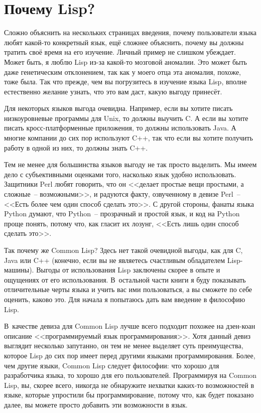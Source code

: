 \section{Почему Lisp?}

Сложно объяснить на нескольких страницах введения, почему пользователи языка любят
какой-то конкретный язык, ещё сложнее объяснить, почему вы должны тратить своё время на
его изучение. Личный пример не слишком убеждает. Может быть, я люблю Lisp из-за какой-то
мозговой аномалии. Это может быть даже генетическим отклонением, так
как у моего отца эта аномалия, похоже, тоже была. Так что прежде, чем вы погрузитесь в изучение языка
Lisp, вполне естественно желание узнать, что это вам даст, какую выгоду
принесёт.

Для некоторых языков выгода очевидна. Например, если вы хотите писать низкоуровневые
программы для Unix, то должны выучить C. А если вы хотите писать кросс-платформенные
приложения, то должны использовать Java. А многие компании до сих пор используют
C++, так что если вы хотите получить работу в одной из них, то должны знать C++.

Тем не менее для большинства языков выгоду не так просто выделить. Мы имеем дело с
субъективными оценками того, насколько язык удобно использовать. Защитники Perl любят
говорить, что он <<делает простые вещи простыми, а сложные~-- возможными>>, и радуются факту,
озвученному в девизе Perl~-- <<Есть более чем один способ сделать это>>. С другой стороны,
фанаты языка Python думают, что Python~-- прозрачный и простой язык, и код на Python проще
понять, потому что, как гласит их лозунг, <<Есть лишь один способ сделать это>>.

Так почему же Common Lisp? Здесь нет такой очевидной выгоды, как для C, Java или C++
(конечно, если вы не являетесь счастливым обладателем Lisp-машины). Выгоды от использования
Lisp заключены скорее в опыте и ощущениях от его использования. В~остальной части книги
я буду показывать отличительные черты языка и учить вас ими пользоваться, а вы сможете
по себе оценить, каково это. Для начала я попытаюсь дать вам введение в философию Lisp.

В~качестве девиза для Common Lisp лучше всего подходит похожее на дзен-коан описание
<<программируемый язык программирования>>. Хотя данный девиз выглядит несколько запутанно,
он тем не менее выделяет суть преимущества, которое Lisp до сих пор имеет перед другими
языками программирования. Более, чем другие языки, Common Lisp следует философии: что
хорошо для разработчика языка, то хорошо для его пользователей. Программируя на Common
Lisp, вы, скорее всего, никогда не обнаружите нехватки каких-то возможностей в языке,
которые упростили бы программирование, потому что, как будет показано далее, вы можете
просто добавить эти возможности в язык.

